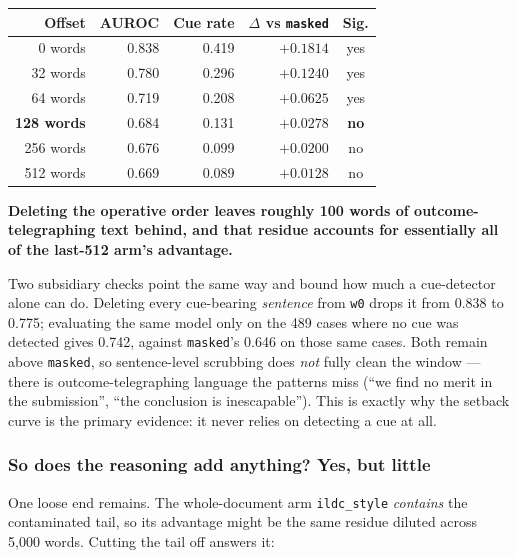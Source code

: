 \documentclass[12pt,a4paper]{article}
\newcommand{\code}[1]{\texttt{\small #1}}
\begin{document}
\begin{center}
\begin{tabular}{@{}rrrrc@{}}
\toprule
\textbf{Offset} & \textbf{AUROC} & \textbf{Cue rate} & \textbf{$\Delta$ vs \code{masked}} & \textbf{Sig.} \\
\midrule
0 words   & 0.838 & 0.419 & $+0.1814$ & yes \\
32 words  & 0.780 & 0.296 & $+0.1240$ & yes \\
64 words  & 0.719 & 0.208 & $+0.0625$ & yes \\
\textbf{128 words} & 0.684 & 0.131 & $+0.0278$ & \textbf{no} \\
256 words & 0.676 & 0.099 & $+0.0200$ & no \\
512 words & 0.669 & 0.089 & $+0.0128$ & no \\
\bottomrule
\end{tabular}
\end{center}

\textbf{Deleting the operative order leaves roughly 100 words of outcome-telegraphing text behind,
and that residue accounts for essentially all of the last-512 arm's advantage.}

Two subsidiary checks point the same way and bound how much a cue-detector alone can do. Deleting
every cue-bearing \emph{sentence} from \code{w0} drops it from 0.838 to 0.775; evaluating the same
model only on the 489 cases where no cue was detected gives 0.742, against \code{masked}'s 0.646 on
those same cases. Both remain above \code{masked}, so sentence-level scrubbing does \emph{not} fully
clean the window --- there is outcome-telegraphing language the patterns miss (``we find no merit in
the submission'', ``the conclusion is inescapable''). This is exactly why the setback curve is the
primary evidence: it never relies on detecting a cue at all.

\subsubsection*{So does the reasoning add anything? Yes, but little}

One loose end remains. The whole-document arm \code{ildc\_style} \emph{contains} the contaminated
tail, so its advantage might be the same residue diluted across 5,000 words. Cutting the tail off
answers it:
\end{document}
